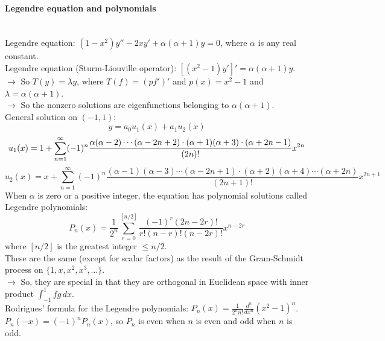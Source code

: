 \documentclass[10pt]{article}
\begin{document}
\paragraph{Legendre equation and polynomials}\ \\
Legendre equation: $(1 - x^2)y'' - 2xy' + \alpha (\alpha + 1) y = 0$, where $\alpha$ is any real constant.\\
Legendre equation (Sturm-Liouville operator): $[(x^2 - 1)y']' = \alpha(\alpha + 1)y$.\\
$\to$ So $T(y) = \lambda y$, where $T(f) = (pf')'$ and $p(x) = x^2 - 1$ and $\lambda = \alpha(\alpha + 1)$.\\
$\to$ So the nonzero solutions are eigenfunctions belonging to $\alpha(\alpha + 1)$.\\
General solution on $(-1, 1)$:
\begin{equation*}
y = a_0u_1(x) + a_1u_2(x)
\end{equation*}
\begin{equation*}
u_1(x) = 1 + \sum_{n=1}^\infty (-1)^n \frac{\alpha (\alpha - 2) \dotsb (\alpha - 2n + 2) \cdot 
(\alpha + 1) (\alpha + 3) \cdot (\alpha + 2n - 1)}{(2n)!} x^{2n}\\
\end{equation*}
\begin{equation*}
u_2(x) = x + \sum_{n=1}^\infty (-1)^n \frac{(\alpha - 1)(\alpha - 3) \dotsb (\alpha - 2n + 1) \cdot
(\alpha + 2)(\alpha + 4) \dotsb (\alpha + 2n)}{(2n + 1)!} x^{2n+1}
\end{equation*}
When $\alpha$ is zero or a positive integer, the equation has polynomial solutions called Legendre polynomials:
\begin{equation*}
P_n(x) = \frac{1}{2^n} \sum_{r=0}^{[n/2]} \frac{(-1)^r(2n-2r)!}{r!(n-r)!(n-2r)!} x^{n-2r}
\end{equation*}
where $[n/2]$ is the greatest integer $\leq n/2$.\\
These are the same (except for scalar factors) as the result of the Gram-Schmidt process on $\{1, x, x^2, x^3, \dotsc\}$.\\
$\to$ So, they are special in that they are orthogonal in Euclidean space with inner product $\int_{-1}^1 fg\,dx$.\\
Rodrigues' formula for the Legendre polynomials: $P_n(x) = \frac{1}{2^nn!} \frac{d^n}{dx^n} (x^2 - 1)^n$.\\
$P_n(-x) = (-1)^nP_n(x)$, so $P_n$ is even when $n$ is even and odd when $n$ is odd.
\end{document}
